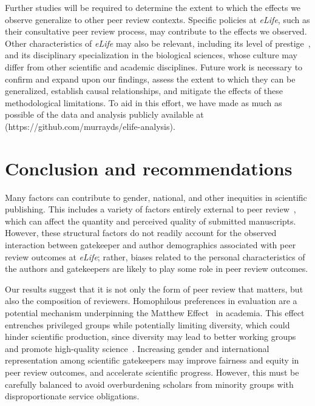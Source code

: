 \documentclass[10pt,letterpaper]{article}
\begin{document}
Further studies will be required to determine the extent to which the effects we observe generalize to other peer review contexts. Specific policies at \textit{eLife}, such as their consultative peer review process, may contribute to the effects we observed. Other characteristics of \textit{eLife} may also be relevant, including its level of prestige~\cite{shen_persistent_2018}, and its disciplinary specialization in the biological sciences, whose culture may differ from other scientific and academic disciplines. Future work is necessary to confirm and expand upon our findings, assess the extent to which they can be generalized, establish causal relationships, and mitigate the effects of these methodological limitations. To aid in this effort, we have made as much as possible of the data and analysis publicly available at (https://github.com/murrayds/elife-analysis).

%
%
\section*{Conclusion and recommendations}

Many factors can contribute to gender, national, and other inequities in scientific publishing. This includes a variety of factors entirely external to peer review~\cite{adamo_attrition_2013, ceci_womens_2009, ceci_sex_2010, ceci_understanding_2011, xie_sex_1998, may_scientific_1997}, which can affect the quantity and perceived quality of submitted manuscripts. However, these structural factors do not readily account for the observed interaction between gatekeeper and author demographics associated with peer review outcomes at \textit{eLife}; rather, biases related to the personal characteristics of the authors and gatekeepers are likely to play some role in peer review outcomes. 

Our results suggest that it is not only the form of peer review that matters, but also the composition of reviewers. Homophilous preferences in evaluation are a potential mechanism underpinning the Matthew Effect~\cite{merton_matthew_1968} in academia. This effect entrenches privileged groups while potentially limiting diversity, which could hinder scientific production, since diversity may lead to better working groups~\cite{page_difference:_2008} and promote high-quality science~\cite{campbell_gender-heterogeneous_2013, noauthor_science_2018}. Increasing gender and international representation among scientific gatekeepers may improve fairness and equity in peer review outcomes, and accelerate scientific progress. However, this must be carefully balanced to avoid overburdening scholars from minority groups with disproportionate service obligations. 
\end{document}
